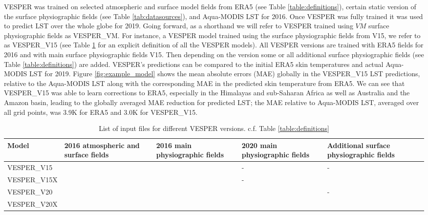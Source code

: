 \documentclass[hess, twostagejnl]{copernicus}
\begin{document}
 \noindent VESPER was trained on selected atmospheric and surface model fields from ERA5 (see Table \ref{table:definitions}), certain static version of the surface physiographic fields (see Table \ref{tab:datasources}), and Aqua-MODIS LST for 2016. Once VESPER was fully trained it was used to predict LST over the whole globe for 2019.  Going forward, as a shorthand we will refer to VESPER trained using $VM$ surface physiographic fields as VESPER\_VM. For instance, a VESPER model trained using the surface physiographic fields from V15, we refer to as VESPER\_V15 (see Table \ref{tab:vesper_table} for an explicit definition of all the VESPER models). All VESPER versions are trained with ERA5 fields for 2016 and with main surface physiographic fields V15. Then depending on the version some or all additional surface physiographic fields (see Table \ref{table:definitions}) are added. VESPER’s predictions can be compared to the initial ERA5 skin temperatures and actual Aqua-MODIS LST for 2019. Figure \ref{fig:example_model} shows the mean absolute errors (MAE) globally in the VESPER\_V15 LST predictions, relative to the Aqua-MODIS LST along with the corresponding MAE in the predicted skin temperature from ERA5. We can see that VESPER\_V15 was able to learn corrections to ERA5, especially in the Himalayas and sub-Saharan Africa as well as Australia and the Amazon basin, leading to the globally averaged MAE reduction for predicted LST; the MAE relative to  Aqua-MODIS LST, averaged over all grid points, was 3.9K for ERA5 and 3.0K for VESPER\_V15. \newline 
  
 \begin{table}
 	\begin{tabularx}{\textwidth}{lXXXX}
 		\toprule
 		Model & 2016 atmospheric and surface fields & 2016 main physiographic fields & 2020 main physiographic fields & Additional surface physiographic fields \\
 		\hline
 		VESPER\_V15 & \checkmark & \checkmark & - & - \\
 		VESPER\_V15X & \checkmark & \checkmark & - & \checkmark \\
 		VESPER\_V20 & \checkmark & \checkmark & \checkmark & - \\
 		VESPER\_V20X & \checkmark & \checkmark & \checkmark & \checkmark \\
 		
 		\bottomrule
 	\end{tabularx}
 	\caption{List of input files for different VESPER versions. c.f. Table \ref{table:definitions}}
 	\label{tab:vesper_table}
 \end{table}
 
\end{document}
